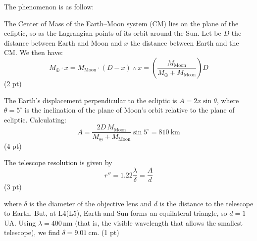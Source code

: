 The phenomenon is as follow:

The Center of Mass of the Earth--Moon system (CM) lies on the plane of the
ecliptic, so as the Lagrangian points of its orbit around the Sun. Let be $D$
the distance between Earth and Moon and $x$ the distance between Earth and
the CM. We then have:
\[
M_\oplus \cdot x = M_{\mathrm{Moon}} \cdot (D - x)
\ \therefore\
x = \left(\frac{M_{\mathrm{Moon}}}{M_\oplus + M_{\mathrm{Moon}}}\right)D
\]
\hfill(2 pt)

The Earth's displacement perpendicular to the ecliptic is $A = 2x\sin\theta$,
where $\theta = 5^\circ$ is the inclination of the plane of Moon's orbit
relative to the plane of ecliptic. Calculating:
\[
A = \frac{2D\,M_{\mathrm{Moon}}}{M_\oplus + M_{\mathrm{Moon}}}\sin 5^\circ
 = 810\ \mathrm{km}
\]
\hfill(4 pt)

The telescope resolution is given by
\[
r'' = 1.22\frac{\lambda}{\delta} = \frac{A}{d}
\]
\hfill(3 pt)

where $\delta$ is the diameter of the objective lens and $d$ is the distance
to the telescope to Earth. But, at L4(L5), Earth and Sun forms an equilateral
triangle, so $d = 1$\,UA. Using $\lambda = 400$\,nm (that is, the visible
wavelength that allows the smallest telescope), we find
$\delta = 9.01\ \mathrm{cm}$.
\hfill(1 pt)
